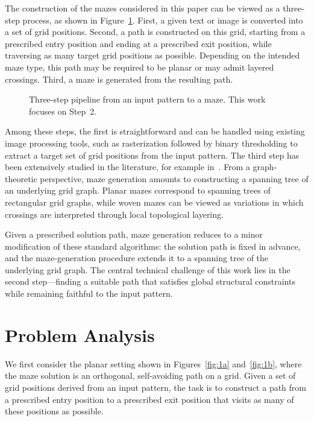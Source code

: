 \documentclass[letterpaper,11pt]{article}
\begin{document}
The construction of the mazes considered in this paper can be viewed
as a three-step process, as shown in Figure~\ref{fig:pipeline}. First,
a given text or image is converted into a set of grid
positions. Second, a path is constructed on this grid, starting from a
prescribed entry position and ending at a prescribed exit position,
while traversing as many target grid positions as possible. Depending
on the intended maze type, this path may be required to be planar or
may admit layered crossings. Third, a maze is generated from the
resulting path.

\begin{figure}[h!tbp]
  \centering
  
  \caption{Three-step pipeline from an input pattern to a maze. This work focuses on Step~2.}
  \label{fig:pipeline}
\end{figure}

Among these steps, the first is straightforward and can be handled
using existing image processing tools, such as rasterization followed
by binary thresholding to extract a target set of grid positions from
the input pattern. The third step has been extensively studied in the
literature, for example in~\cite{Buck2015MazesForProgrammers}. From a
graph-theoretic perspective, maze generation amounts to constructing a
spanning tree of an underlying grid graph. Planar mazes correspond to
spanning trees of rectangular grid graphs, while woven mazes can be
viewed as variations in which crossings are interpreted through local
topological layering.

Given a prescribed solution path, maze generation reduces to a minor
modification of these standard algorithms: the solution path is fixed
in advance, and the maze-generation procedure extends it to a spanning
tree of the underlying grid graph. The central technical challenge of
this work lies in the second step---finding a suitable path that
satisfies global structural constraints while remaining faithful to
the input pattern.

\section*{Problem Analysis}

We first consider the planar setting shown in Figures~\ref{fig:1a}
and~\ref{fig:1b}, where the maze solution is an orthogonal,
self-avoiding path on a grid. Given a set of grid positions derived
from an input pattern, the task is to construct a path from a
prescribed entry position to a prescribed exit position that visits as
many of these positions as possible.
\end{document}
